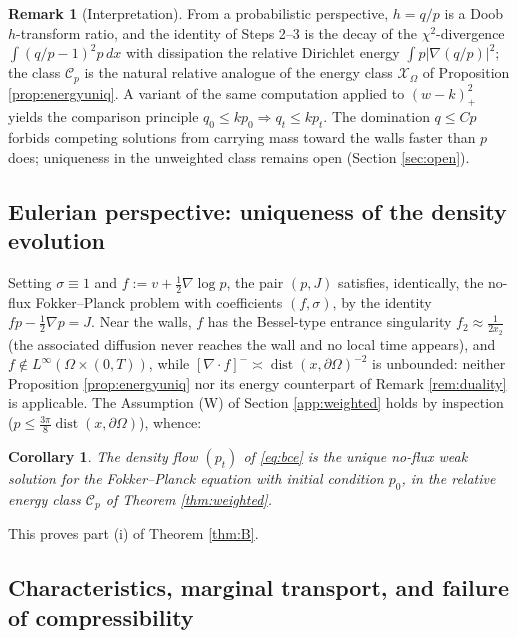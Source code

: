 \documentclass[11pt]{amsart}
\newtheorem{corollary}[theorem]{Corollary}
\theoremstyle{definition}
\newtheorem{remark}[theorem]{Remark}
\newcommand{\dive}{\nabla\!\cdot}
\newcommand{\dd}{\,d}
\begin{document}
\begin{remark}[Interpretation]\label{rem:chisq}
From a probabilistic perspective, $h=q/p$ is a Doob $h$-transform ratio, and the
identity of Steps 2--3 is the decay of the $\chi^2$-divergence
$\int(q/p-1)^2p\dd x$ with dissipation the relative Dirichlet energy
$\int p|\nabla(q/p)|^2$; the class $\mathcal{C}_p$ is the natural
relative analogue of the energy class $\mathcal{X}_\Omega$ of
Proposition \ref{prop:energyuniq}. A variant of the same computation
applied to $(w-k)_+^2$ yields the comparison principle
$q_0\le kp_0\Rightarrow q_t\le kp_t$. The domination $q\le Cp$
forbids competing solutions from carrying mass toward the walls
faster than $p$ does; uniqueness in the unweighted class remains
open (Section \ref{sec:open}).
\end{remark}

\subsection{Eulerian perspective: uniqueness of the density evolution}

Setting $\sigma\equiv1$ and $f:=v+\tfrac12\nabla\log p$, the pair
$(p,J)$ satisfies, identically, the no-flux Fokker--Planck problem
with coefficients $(f,\sigma)$, by the identity
$fp-\tfrac12\nabla p=J$. Near the walls, $f$ has the Bessel-type
entrance singularity $f_2\approx\tfrac{1}{2x_2}$ (the associated
diffusion never reaches the wall and no local time appears), and
$f\notin L^\infty(\Omega\times(0,T))$, while
$[\dive f]^-\asymp\operatorname{dist}(x,\partial\Omega)^{-2}$ is
unbounded: neither Proposition \ref{prop:energyuniq} nor its energy
counterpart of Remark \ref{rem:duality} is applicable. The
Assumption (W) of Section  \ref{app:weighted} holds by inspection
($p\le\tfrac{3\pi}{8}\operatorname{dist}(x,\partial\Omega)$),
whence:
\begin{corollary}\label{cor:bcuniq} The density flow
$(p_t)$ of \eqref{eq:bce} is the unique no-flux weak solution for the  Fokker--Planck equation with initial condition $p_0$,  in the 
relative energy class $\mathcal{C}_p$ of Theorem \ref{thm:weighted}.
\end{corollary}
This proves part \textup{(i)} of Theorem \ref{thm:B}.
\subsection{Characteristics, marginal transport, and failure of compressibility}
\end{document}
